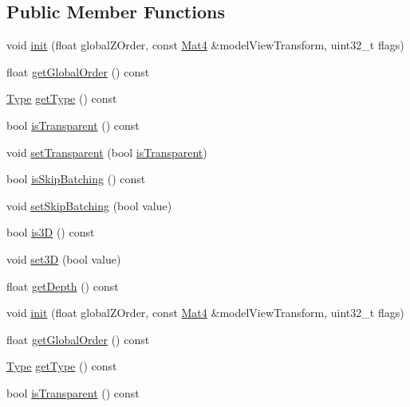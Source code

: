\subsection*{Public Member Functions}
\begin{DoxyCompactItemize}
\item 
void \hyperlink{classRenderCommand_a5a7db00ae95b9f75e16ee1d7565dbd5f}{init} (float global\+Z\+Order, const \hyperlink{classMat4}{Mat4} \&model\+View\+Transform, uint32\+\_\+t flags)
\item 
float \hyperlink{classRenderCommand_a985166e1d5e2e76d8c2e898df9affe27}{get\+Global\+Order} () const
\item 
\hyperlink{classRenderCommand_a17af6f8ac8e8a22a9007287a70ae5d1e}{Type} \hyperlink{classRenderCommand_aede03e6c9ee6d5382aa9eb64a9f1efb0}{get\+Type} () const
\item 
bool \hyperlink{classRenderCommand_ae1fd8d457e581f0dc5bd7ba1f713f815}{is\+Transparent} () const
\item 
void \hyperlink{classRenderCommand_ae0e5114be31f9898e6b43d212f0682c7}{set\+Transparent} (bool \hyperlink{classRenderCommand_ae1fd8d457e581f0dc5bd7ba1f713f815}{is\+Transparent})
\item 
bool \hyperlink{classRenderCommand_a365205f076e44d2d88f2e1e3ef19fddf}{is\+Skip\+Batching} () const
\item 
void \hyperlink{classRenderCommand_ae44204f67966be88c29cfdd568471704}{set\+Skip\+Batching} (bool value)
\item 
bool \hyperlink{classRenderCommand_a25ba2f4afa64eebd1433f8ba35c048d0}{is3D} () const
\item 
void \hyperlink{classRenderCommand_a2f19b23dcc4fa705c4af932df41c5606}{set3D} (bool value)
\item 
float \hyperlink{classRenderCommand_af3fb4b32d8dbc7fd216e15f75f31e75c}{get\+Depth} () const
\item 
void \hyperlink{classRenderCommand_a5a7db00ae95b9f75e16ee1d7565dbd5f}{init} (float global\+Z\+Order, const \hyperlink{classMat4}{Mat4} \&model\+View\+Transform, uint32\+\_\+t flags)
\item 
float \hyperlink{classRenderCommand_a985166e1d5e2e76d8c2e898df9affe27}{get\+Global\+Order} () const
\item 
\hyperlink{classRenderCommand_a17af6f8ac8e8a22a9007287a70ae5d1e}{Type} \hyperlink{classRenderCommand_aede03e6c9ee6d5382aa9eb64a9f1efb0}{get\+Type} () const
\item 
bool \hyperlink{classRenderCommand_ae1fd8d457e581f0dc5bd7ba1f713f815}{is\+Transparent} () const

\end{DoxyCompactItemize}

